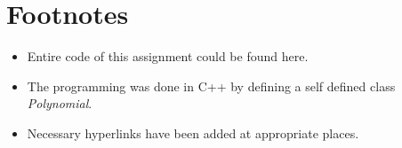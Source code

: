 \section{Footnotes}

\begin{itemize}
    \item Entire code of this assignment could be found here. \href{https://gist.github.com/1-Harshit/58b28e8861f32bf7463671d5e48c2370}{\faGithub}
    \item The programming was done in C++ by defining a self defined class \textit{Polynomial}.
    \item Necessary hyperlinks have been added at appropriate places.
\end{itemize}